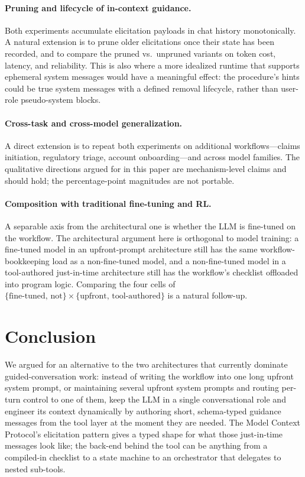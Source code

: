 \documentclass[11pt,a4paper]{article}
\begin{document}
\paragraph{Pruning and lifecycle of in-context guidance.}
Both experiments accumulate elicitation payloads in chat history monotonically. A natural extension is to prune older elicitations once their state has been recorded, and to compare the pruned vs.\ unpruned variants on token cost, latency, and reliability. This is also where a more idealized runtime that supports ephemeral system messages would have a meaningful effect: the procedure's hints could be true system messages with a defined removal lifecycle, rather than user-role pseudo-system blocks.

\paragraph{Cross-task and cross-model generalization.}
A direct extension is to repeat both experiments on additional workflows---claims initiation, regulatory triage, account onboarding---and across model families. The qualitative directions argued for in this paper are mechanism-level claims and should hold; the percentage-point magnitudes are not portable.

\paragraph{Composition with traditional fine-tuning and RL.}
A separable axis from the architectural one is whether the LLM is fine-tuned on the workflow. The architectural argument here is orthogonal to model training: a fine-tuned model in an upfront-prompt architecture still has the same workflow-bookkeeping load as a non-fine-tuned model, and a non-fine-tuned model in a tool-authored just-in-time architecture still has the workflow's checklist offloaded into program logic. Comparing the four cells of $\{\text{fine-tuned},\,\text{not}\}\times\{\text{upfront},\,\text{tool-authored}\}$ is a natural follow-up.

\section{Conclusion}

We argued for an alternative to the two architectures that currently dominate guided-conversation work: instead of writing the workflow into one long upfront system prompt, or maintaining several upfront system prompts and routing per-turn control to one of them, keep the LLM in a single conversational role and engineer its context dynamically by authoring short, schema-typed guidance messages from the tool layer at the moment they are needed. The Model Context Protocol's elicitation pattern gives a typed shape for what those just-in-time messages look like; the back-end behind the tool can be anything from a compiled-in checklist to a state machine to an orchestrator that delegates to nested sub-tools.
\end{document}
